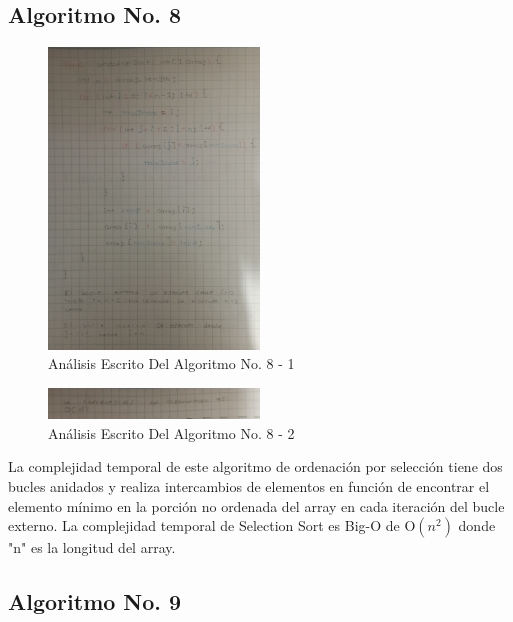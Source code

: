 \documentclass[journal, spanish]{IEEEtran}
\begin{document}
\subsection{Algoritmo No. 8}

\begin{figure}[H]
  \centering
  \includegraphics[width=0.5\textwidth]{images/IMG_20230913_023459~2.jpg}
  \caption{Análisis Escrito Del Algoritmo No. 8 - 1}
  \label{fig:nombre_de_tu_imagen}
\end{figure}

\begin{figure}[H]
  \centering
  \includegraphics[width=0.5\textwidth]{images/IMG_20230913_023543~2.jpg}
  \caption{Análisis Escrito Del Algoritmo No. 8 - 2}
  \label{fig:nombre_de_tu_imagen}
\end{figure}

La complejidad temporal de este algoritmo de ordenación por selección tiene dos bucles anidados y realiza intercambios de elementos en función de encontrar el elemento mínimo en la porción no ordenada del array en cada iteración del bucle externo. La complejidad temporal de Selection Sort es Big-O de O$(n^2)$ donde "n" es la longitud del array.

\subsection{Algoritmo No. 9}
\end{document}
